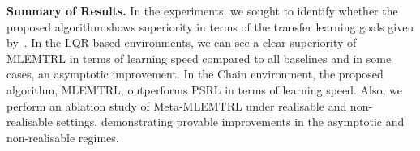 \noindent\textbf{Summary of Results.} In the experiments, we sought to identify whether the proposed algorithm shows superiority in terms of the transfer learning goals given by~\citep{langley2006transfer}. In the LQR-based environments, we can see a clear superiority of MLEMTRL in terms of learning speed compared to all baselines and in some cases, an asymptotic improvement. In the Chain environment, the proposed algorithm, MLEMTRL, outperforms PSRL in terms of learning speed. Also, we perform an ablation study of Meta-MLEMTRL under realisable and non-realisable settings, demonstrating provable improvements in the asymptotic and non-realisable regimes.






